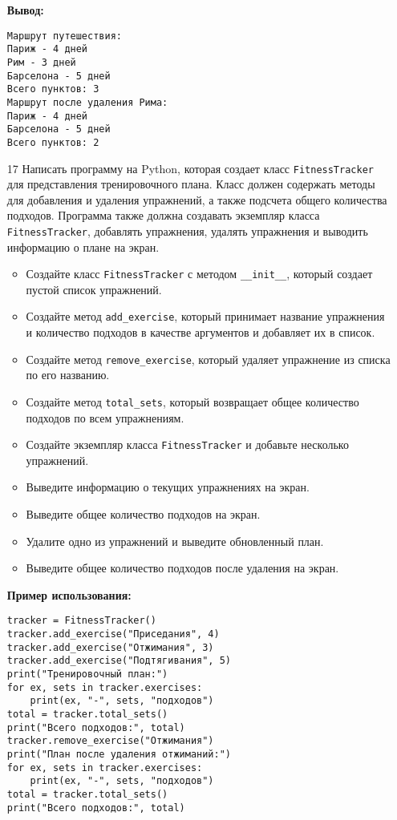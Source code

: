 \begin{enumerate}
\textbf{Вывод:}
\begin{verbatim}
Маршрут путешествия:
Париж - 4 дней
Рим - 3 дней
Барселона - 5 дней
Всего пунктов: 3
Маршрут после удаления Рима:
Париж - 4 дней
Барселона - 5 дней
Всего пунктов: 2
\end{verbatim}

\item[17] Написать программу на Python, которая создает класс \texttt{FitnessTracker} для представления тренировочного плана. Класс должен содержать методы для добавления и удаления упражнений, а также подсчета общего количества подходов. Программа также должна создавать экземпляр класса \texttt{FitnessTracker}, добавлять упражнения, удалять упражнения и выводить информацию о плане на экран.

\begin{itemize}
    \item Создайте класс \texttt{FitnessTracker} с методом \texttt{\_\_init\_\_}, который создает пустой список упражнений.
    \item Создайте метод \texttt{add\_exercise}, который принимает название упражнения и количество подходов в качестве аргументов и добавляет их в список.
    \item Создайте метод \texttt{remove\_exercise}, который удаляет упражнение из списка по его названию.
    \item Создайте метод \texttt{total\_sets}, который возвращает общее количество подходов по всем упражнениям.
    \item Создайте экземпляр класса \texttt{FitnessTracker} и добавьте несколько упражнений.
    \item Выведите информацию о текущих упражнениях на экран.
    \item Выведите общее количество подходов на экран.
    \item Удалите одно из упражнений и выведите обновленный план.
    \item Выведите общее количество подходов после удаления на экран.
\end{itemize}

\textbf{Пример использования:}

\begin{verbatim}
tracker = FitnessTracker()
tracker.add_exercise("Приседания", 4)
tracker.add_exercise("Отжимания", 3)
tracker.add_exercise("Подтягивания", 5)
print("Тренировочный план:")
for ex, sets in tracker.exercises:
    print(ex, "-", sets, "подходов")
total = tracker.total_sets()
print("Всего подходов:", total)
tracker.remove_exercise("Отжимания")
print("План после удаления отжиманий:")
for ex, sets in tracker.exercises:
    print(ex, "-", sets, "подходов")
total = tracker.total_sets()
print("Всего подходов:", total)
\end{verbatim}


\end{enumerate}
